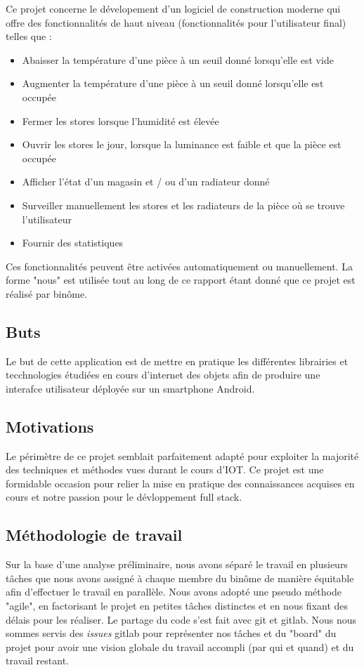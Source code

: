 Ce projet concerne le dévelopement d'un logiciel de construction moderne qui offre des fonctionnalités de haut niveau (fonctionnalités pour l'utilisateur final) telles que :
\begin{itemize}
    \item Abaisser la température d'une pièce à un seuil donné lorsqu'elle est vide
    \item Augmenter la température d'une pièce à un seuil donné lorsqu'elle est occupée
    \item Fermer les stores lorsque l'humidité est élevée
    \item Ouvrir les stores le jour, lorsque la luminance est faible et que la pièce est occupée
    \item Afficher l'état d'un magasin et / ou d'un radiateur donné
    \item Surveiller manuellement les stores et les radiateurs de la pièce où se trouve l'utilisateur
    \item Fournir des statistiques
\end{itemize}
Ces fonctionnalités peuvent être activées automatiquement ou manuellement. La forme "nous" est utilisée tout au long de ce rapport étant donné que ce projet est réalisé par binôme.

\subsection{Buts}
Le but de cette application est de mettre en pratique les différentes librairies et tecchnologies étudiées en cours d'internet des objets afin de produire une interafce utilisateur déployée sur un smartphone Android.

\subsection{Motivations}
Le périmètre de ce projet semblait parfaitement adapté pour exploiter la majorité des techniques et méthodes vues durant le cours d'IOT. Ce projet est une formidable occasion pour relier la mise en pratique des connaissances acquises en cours et notre passion pour le dévloppement full stack.

\subsection{Méthodologie de travail}
Sur la base d'une analyse préliminaire, nous avons séparé le travail en plusieurs tâches que nous avons assigné à chaque membre du binôme de manière équitable afin d'effectuer le travail en parallèle.
Nous avons adopté une pseudo méthode "agile", en factorisant le projet en petites tâches distinctes et en nous fixant des délais pour les réaliser. Le partage du code s'est fait avec git et gitlab. Nous nous sommes servis des \textit{issues} gitlab pour représenter nos tâches et du "board" du projet pour avoir une vision globale du travail accompli (par qui et quand) et du travail restant.

\cite{tmdb} \cite{book}